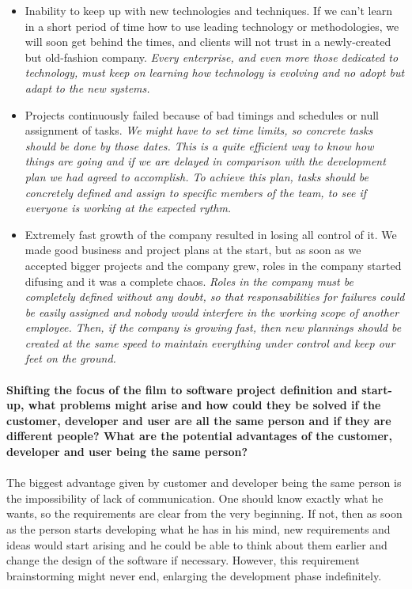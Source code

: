 \documentclass{article}
\begin{document}
\begin{itemize}
	\item Inability to keep up with new technologies and techniques. If we can't learn in a short period of time how to use leading technology or methodologies, we will soon get behind the times, and clients will not trust in a newly-created but old-fashion company. \textit{Every enterprise, and even more those dedicated to technology, must keep on learning how technology is evolving and no adopt but adapt to the new systems.}

	\item Projects continuously failed because of bad timings and schedules or null assignment of tasks. \textit{We might have to set time limits, so concrete tasks should be done by those dates. This is a quite efficient way to know how things are going and if we are delayed in comparison with the development plan we had agreed to accomplish. To achieve this plan, tasks should be concretely defined and assign to specific members of the team, to see if everyone is working at the expected rythm.}

	\item Extremely fast growth of the company resulted in losing all control of it. We made good business and project plans at the start, but as soon as we accepted bigger projects and the company grew, roles in the company started difusing and it was a complete chaos. \textit{Roles in the company must be completely defined without any doubt, so that responsabilities for failures could be easily assigned and nobody would interfere in the working scope of another employee. Then, if the company is growing fast, then new plannings should be created at the same speed to maintain everything under control and keep our feet on the ground.}
\end{itemize}

\paragraph{Shifting the focus of the film to software project definition and start-up, what problems might arise and how could they be solved if the customer, developer and user are all the same person and if they are different people? What are the potential advantages of the customer, developer and user being the same person?}
\paragraph{}


The biggest advantage given by customer and developer being the same person is the impossibility of lack of communication. One should know exactly what he wants, so the requirements are clear from the very beginning. If not, then as soon as the person starts developing what he has in his mind, new requirements and ideas would start arising and he could be able to think about them earlier and change the design of the software if necessary. However, this requirement brainstorming might never end, enlarging the development phase indefinitely.
\end{document}
